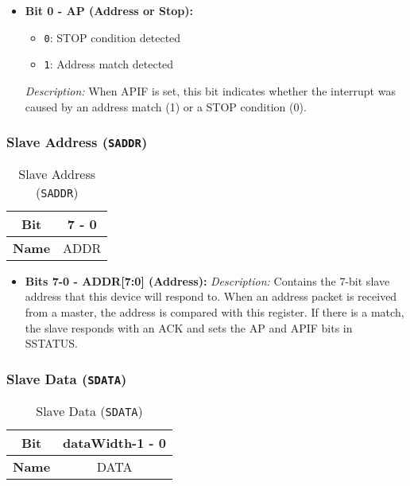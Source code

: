 \begin{itemize}
    \item \textbf{Bit 0 - AP (Address or Stop):} 
    \begin{itemize}
        \item \texttt{0}: STOP condition detected
        \item \texttt{1}: Address match detected
    \end{itemize}
    \textit{Description:} When APIF is set, this bit indicates whether the interrupt was caused by an address match (1) or a STOP condition (0).
\end{itemize}

\subsubsection{Slave Address (\texttt{SADDR})}
\label{sec:saddr}

\begin{table}[H]
  \centering
  \caption{Slave Address (\texttt{SADDR})}
  \begin{tabular}{@{}cc@{}}
      \toprule
      \textbf{Bit} & 7 - 0 \\ \midrule
      \textbf{Name} & ADDR \\ \bottomrule
  \end{tabular}
  \label{tab:saddr}
\end{table}

\begin{itemize}
  \item \textbf{Bits 7-0 - ADDR[7:0] (Address):} 
  \textit{Description:} Contains the 7-bit slave address that this device will respond to. When an address packet is received from a master, the address is compared with this register. If there is a match, the slave responds with an ACK and sets the AP and APIF bits in SSTATUS.
\end{itemize}

\subsubsection{Slave Data (\texttt{SDATA})}
\label{sec:sdata}

\begin{table}[H]
  \centering
  \caption{Slave Data (\texttt{SDATA})}
  \begin{tabular}{@{}cc@{}}
      \toprule
      \textbf{Bit} & dataWidth-1 - 0 \\ \midrule
      \textbf{Name} & DATA \\ \bottomrule
  \end{tabular}
  \label{tab:sdata}
\end{table}

